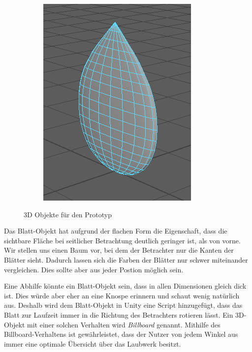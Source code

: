 \begin{figure}[htb]
\begin{subfigure}[b]{\fwidth}
  	\includegraphics[width=\textwidth]{figures/leaf}
  	 \label{fig:leaf}
  \end{subfigure}
  \caption{3D Objekte für den Prototyp} \label{fig:3d-objects}
\end{figure}

Das Blatt-Objekt hat aufgrund der flachen Form die Eigenschaft, dass die sichtbare Fläche bei seitlicher Betrachtung deutlich geringer ist, als von vorne. Wir stellen uns einen Baum vor, bei dem der Betrachter nur die Kanten der Blätter sieht. Dadurch lassen sich die Farben der Blätter nur schwer miteinander vergleichen. Dies sollte aber aus jeder Postion möglich sein.

Eine Abhilfe könnte ein Blatt-Objekt sein, dass in allen Dimensionen gleich dick ist. Dies würde aber eher an eine Knospe erinnern und schaut wenig natürlich aus. Deshalb wird dem Blatt-Objekt in Unity eine Script hinzugefügt, dass das Blatt zur Laufzeit immer in die Richtung des Betrachters rotieren lässt. Ein 3D-Objekt mit einer solchen Verhalten wird \textit{Billboard} genannt. Mithilfe des Billboard-Verhaltens ist gewährleistet, dass der Nutzer von jedem Winkel aus immer eine optimale Übersicht über das Laubwerk besitzt.

